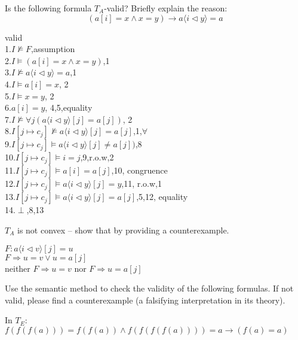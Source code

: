 \documentclass[11pt,a4paper]{article}
\newcommand{\upd}[2]{\langle #1 \triangleleft #2 \rangle}
\begin{document}
\subproblem Is the following formula $T_A$-valid? Briefly explain the reason:
$$(a[i] = x \land x = y) \to a \upd{i}{y} = a$$

\begin{solution}
	valid\\
	1.$I \not \models F$,assumption\\
    2.$I \models (a[i] = x \land x = y)$,1\\
    3.$I \not \models a \upd{i}{y} = a$,1\\
    4.$I \models a[i] = x$, 2\\
    5.$I \models x = y$, 2\\
    6.$a[i] = y$, 4,5,equality\\
    7.$I \not \models \forall j(a \upd{i}{y}[j] = a[j])$, 2\\
    8.$I[j \mapsto c_j] \not\models a \upd{i}{y}[j] = a[j]$,1,$\forall$\\    
    9.$I[j \mapsto c_j] \models a \upd{i}{y}[j] \neq a[j])$,8\\
    10.$I[j \mapsto c_j] \models i = j$,9,r.o.w,2\\
    11.$I[j \mapsto c_j] \models a[i] = a[j]$,10, congruence\\
    12.$I[j \mapsto c_j] \models a\upd{i}{y}[j] = y$,11, r.o.w,1\\
    13.$I[j \mapsto c_j] \models a\upd{i}{y}[j] = a[j]$,5,12, equality\\
    14.$\perp$,8,13
\end{solution}

\subproblem $T_A$ is not convex -- show that by providing a counterexample.

\begin{solution}
   $F:a\upd{i}{v}[j] = u$\\
   $F \Rightarrow u = v \lor u = a[j]$\\
   neither $F \Rightarrow u = v$ nor $F \Rightarrow u = a[j]$\\
\end{solution}

\newpage
{}

Use the semantic method to check the validity of the following formulas.
If not valid, please find a counterexample (a falsifying interpretation in its theory).

\subproblem In $T_E$: $f(f(f(a))) = f(f(a)) \land f(f(f(f(a)))) = a \to (f(a) = a)$
\end{document}
